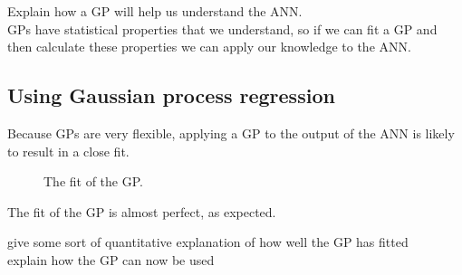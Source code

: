 \begin{todo}
	Explain how a GP will help us understand the ANN. \\
	GPs have statistical properties that we understand, so if we can fit a GP and then calculate these properties we can apply our knowledge to the ANN.
\end{todo}

\subsection{Using Gaussian process regression}

Because \acp{GP} are very flexible, applying a \ac{GP} to the output of the \ac{ANN} is likely to result in a close fit.

\begin{figure}[htbp]
	\centering
	
	\caption{The fit of the \ac{GP}.}
	\label{fig:gp-fit}
\end{figure}

The fit of the \ac{GP} is almost perfect, as expected.

\begin{todo}
	give some sort of quantitative explanation of how well the GP has fitted \\
	explain how the GP can now be used
\end{todo}

